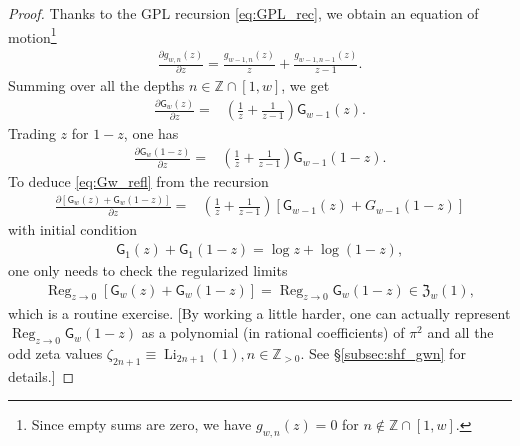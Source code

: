 \documentclass[final,notitlepage,12pt,reqno]{amsart}
\DeclareMathOperator{\Li}{Li}
\DeclareMathOperator*{\Reg}{Reg}
\theoremstyle{plain}
\theoremstyle{definition}
\numberwithin{equation}{section}
\begin{document}
\begin{proof}Thanks to the GPL recursion \eqref{eq:GPL_rec}, we obtain an equation of motion\footnote{Since empty sums are zero, we   have $ g_{w,n}(z)=0$ for $ n\notin\mathbb Z\cap[1,w]$. }\begin{align}
\frac{\partial g_{w,n}(z)}{\partial z}=\frac{ g_{w-1,n}(z)}{z}+\frac{g_{w-1,n-1}(z)}{z-1}.\label{eq:gwn_evolv}
\end{align}Summing over all the depths $ n\in\mathbb Z\cap[1,w]$, we get \begin{align}
\frac{\partial\mathsf G_w(z)}{\partial z}={}&\left( \frac{1}{z} +\frac{1}{z-1}\right)\mathsf G_{w-1}(z).
\end{align}Trading $z$ for $1-z$, one has\begin{align}
\frac{\partial\mathsf G_w(1-z)}{\partial z}={}&\left( \frac{1}{z} +\frac{1}{z-1}\right)\mathsf G_{w-1}(1-z).
\end{align}To deduce \eqref{eq:Gw_refl} from the recursion \begin{align}
\frac{\partial[\mathsf G_w(z)+\mathsf G_w(1-z)]}{\partial z}={}&\left( \frac{1}{z} +\frac{1}{z-1}\right)[\mathsf G_{w-1}(z)+G_{w-1}(1-z)]
\end{align}with initial condition\begin{align}
\mathsf G_1(z)+\mathsf G_1(1-z)=\log z+\log(1-z),
\end{align}one only needs to check the regularized limits \cite[\S2.3]{Panzer2015}\begin{align}
\Reg_{z\to0}[\mathsf G_w(z)+\mathsf G_w(1-z)]=\Reg_{z\to0}\mathsf G_w(1-z)\in \mathfrak Z_w(1),\label{eq:RegG(1-z)}
\end{align}which is a routine exercise.
[By working a little harder, one can actually represent $ \Reg_{z\to0}\mathsf G_w(1-z)$ as a polynomial (in rational coefficients) of $ \pi^2$ and all the odd zeta values $ \zeta_{2n+1}\equiv\Li_{2n+1}(1),n\in\mathbb Z_{>0}$. See  \S\ref{subsec:shf_gwn} for details.]


\end{proof}
\end{document}
